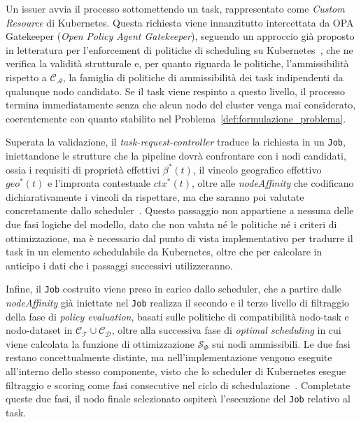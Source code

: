 Un issuer avvia il processo sottomettendo un task, rappresentato come \emph{Custom Resource} di Kubernetes. Questa richiesta viene innanzitutto intercettata da OPA Gatekeeper (\emph{Open Policy Agent Gatekeeper}), seguendo un approccio già proposto in letteratura per l'enforcement di politiche di scheduling su Kubernetes~\cite{policy-driven-sec-aware-scheduling-k8s}, che ne verifica la validità strutturale e, per quanto riguarda le politiche, l'ammissibilità rispetto a $\mathcal{C_A}$, la famiglia di politiche di ammissibilità dei task indipendenti da qualunque nodo candidato. Se il task viene respinto a questo livello, il processo termina immediatamente senza che alcun nodo del cluster venga mai considerato, coerentemente con quanto stabilito nel Problema~\ref{def:formulazione_problema}.

Superata la validazione, il \emph{task-request-controller} traduce la richiesta in un \texttt{Job}, iniettandone le strutture che la pipeline dovrà confrontare con i nodi candidati, ossia i requisiti di proprietà effettivi $\beta^*(t)$, il vincolo geografico effettivo $geo^*(t)$ e l'impronta contestuale $ctx^*(t)$, oltre alle \emph{nodeAffinity} che codificano dichiarativamente i vincoli da rispettare, ma che saranno poi valutate concretamente dallo scheduler~\cite{k8s-node-affinity}. Questo passaggio non appartiene a nessuna delle due fasi logiche del modello, dato che non valuta né le politiche né i criteri di ottimizzazione, ma è necessario dal punto di vista implementativo per tradurre il task in un elemento schedulabile da Kubernetes, oltre che per calcolare in anticipo i dati che i passaggi successivi utilizzeranno.

Infine, il \texttt{Job} costruito viene preso in carico dallo scheduler, che a partire dalle \emph{nodeAffinity} già iniettate nel \texttt{Job} realizza il secondo e il terzo livello di filtraggio della fase di \emph{policy evaluation}, basati sulle politiche di compatibilità nodo-task e nodo-dataset in $\mathcal{C_T} \cup \mathcal{C_D}$, oltre alla successiva fase di \emph{optimal scheduling} in cui viene calcolata la funzione di ottimizzazione $\mathcal{S}_\Phi$ sui nodi ammissibili. Le due fasi restano concettualmente distinte, ma nell'implementazione vengono eseguite all'interno dello stesso componente, visto che lo scheduler di Kubernetes esegue filtraggio e scoring come fasi consecutive nel ciclo di schedulazione~\cite{k8s-scheduler-framework, k8s-scheduler}. Completate queste due fasi, il nodo finale selezionato ospiterà l'esecuzione del \texttt{Job} relativo al task.

